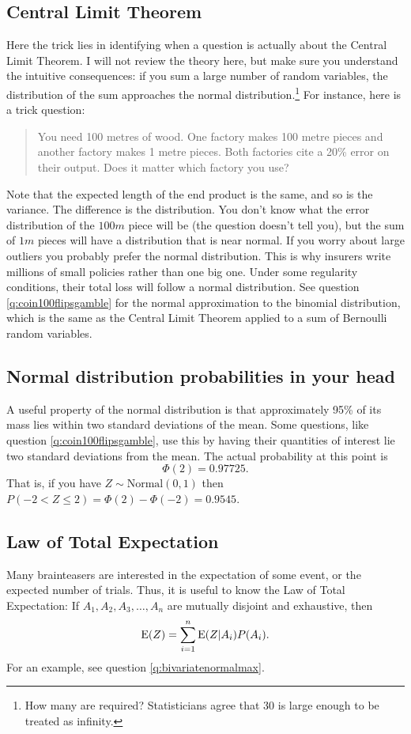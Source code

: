 \documentclass[a4paper]{article}
\begin{document}
\subsection{Central Limit Theorem}
Here the trick lies in identifying when a question is actually about the Central Limit Theorem.
I will not review the theory here, but make sure you understand the intuitive consequences:
if you sum a large number of random variables, the distribution of the sum approaches the normal distribution.\footnote{How many are required? Statisticians agree that 30 is large enough to be treated as infinity.}
For instance, here is a trick question:
\begin{quote}
You need 100 metres of wood.
One factory makes 100 metre pieces and another factory makes 1 metre pieces.
Both factories cite a 20\% error on their output.
Does it matter which factory you use?
\end{quote}
Note that the expected length of the end product is the same, and so is the variance.
The difference is the distribution.
You don't know what the error distribution of the $100m$ piece will be (the question doesn't tell you), but the sum of $1m$ pieces will have a distribution that is near normal.
If you worry about large outliers you probably prefer the normal distribution.
This is why insurers write millions of small policies rather than one big one.
Under some regularity conditions, their total loss will follow a normal distribution.
See question \ref{q:coin100flipsgamble} for the normal approximation to the binomial distribution, which is the same as the Central Limit Theorem applied to a sum of Bernoulli random variables.


\subsection{Normal distribution probabilities in your head}
A useful property of the normal distribution is that approximately 95\% of its mass lies within two standard deviations of the mean.
Some questions, like question \ref{q:coin100flipsgamble}, use this by having their quantities of interest lie two standard deviations from the mean.
The actual probability at this point is
\[
\Phi(2)
=  0.97725
\text{.}
\]
That is, if you have
$Z \sim \text{Normal}(0,1)$
then
$P(-2 <  Z \leq 2) = \Phi(2)- \Phi(-2) = 0.9545$.


\subsection{Law of Total Expectation}
Many brainteasers are interested in the expectation of some event, or the expected number of trials.
Thus, it is useful to know the Law of Total Expectation:
If $ A_1, A_2, A_3, \ldots, A_n$ are mutually disjoint and exhaustive, then
\[
  \operatorname{\mathrm{E}}(Z) = \sum_{i=1}^{n}{
    \operatorname{\mathrm{E}}(Z| A_i)P(A_i)
  }
  \text{.}
\]
For an example, see question \ref{q:bivariatenormalmax}.
\end{document}
